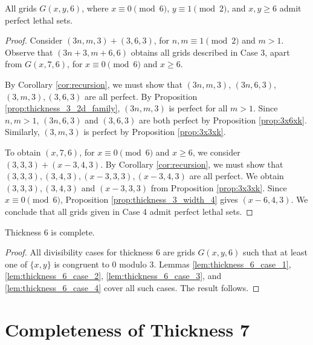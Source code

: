 \begin{lem}
\label{lem:thickness_6_case_4}
All grids $G(x,y,6)$, where $x \equiv 0 \pmod 6$, $y \equiv 1 \pmod 2$, and $x,y \geq 6$ admit perfect lethal sets.
\end{lem}

\begin{proof}
Consider $(3n,m,3) + (3,6,3)$, for $n,m \equiv 1 \pmod 2$ and $m > 1$. Observe that $(3n+3,m+6,6)$ obtains all grids described in Case 3, apart from $G(x,7,6)$, for $x \equiv 0 \pmod 6$ and $x \geq 6$. 

By Corollary \ref{cor:recursion}, we must show that $(3n,m,3)$, $(3n,6,3)$, $(3,m,3), (3,6,3)$ are all perfect. By Proposition \ref{prop:thickness_3_2d_family}, $(3n,m,3)$ is perfect for all $m > 1$. Since $n,m > 1$, $(3n,6,3)$ and $(3,6,3)$ are both perfect by Proposition \ref{prop:3x6xk}. Similarly, $(3,m,3)$ is perfect by Proposition \ref{prop:3x3xk}.

To obtain $(x,7,6)$, for $x \equiv 0 \pmod 6$ and $x \geq 6$, we consider $(3,3,3) + (x-3, 4,3)$. By Corollary \ref{cor:recursion}, we must show that $(3,3,3), (3,4,3), (x-3,3,3), (x-3,4,3)$ are all perfect. We obtain $(3,3,3), (3,4,3)$ and $(x-3,3,3)$ from Proposition \ref{prop:3x3xk}. Since $x \equiv 0 \pmod 6$, Proposition \ref{prop:thickness_3_width_4} gives $(x-6,4,3)$. We conclude that all grids given in Case 4 admit perfect lethal sets. 
\end{proof}

\begin{lem}
\label{lem:thickness_6_complete}
Thickness 6 is complete.
\end{lem}

\begin{proof}
All divisibility cases for thickness 6 are grids $G(x,y,6)$ such that at least one of $\{x,y\}$ is congruent to 0 modulo 3. Lemmas \ref{lem:thickness_6_case_1}, \ref{lem:thickness_6_case_2}, \ref{lem:thickness_6_case_3}, and \ref{lem:thickness_6_case_4} cover all such cases. The result follows.
\end{proof}

\section{Completeness of Thickness 7}

